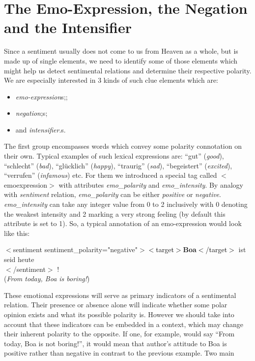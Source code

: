 \documentclass[11pt,a4paper]{article}
\newenvironment{example}{\begin{center}\begin{exe}\ex}{\end{exe}\end{center}}
\newcommand{\xmltag}[1]{\textcolor{black}{{\small$<$#1$>$}}}
\newcommand{\sentiment}[2][negative]{$<$sentiment
  sentiment\_polarity="#1"$>$\textcolor{dodgerblue4}{#2}$<$/sentiment$>$}
\newcommand{\target}[1]{\xmltag{target}\textbf{#1}\xmltag{/target}}
\begin{document}
\section{The Emo-Expression, the Negation and the Intensifier}
Since a sentiment usually does not come to us from Heaven as a whole,
but is made up of single elements, we need to identify some of those
elements which might help us detect sentimental relations and
determine their respective polarity. We are especially interested in 3
kinds of such clue elements which are:
\begin{itemize}
\item \textit{emo-expression}s;\label{eexpression};
\item \textit{negation};\label{negation}s;
\item and \textit{intensifier}.\label{intensifier}s.
\end{itemize}
The first group encompasses words which convey some polarity
connotation on their own. Typical examples of such lexical expressions
are: ``gut'' (\textit{good}), ``schlecht'' (\textit{bad}),
``gl\"ucklich'' (\textit{happy}), ``traurig'' (\textit{sad}),
``begeistert'' (\textit{excited}), ``verrufen'' (\textit{infamous})
etc. For them we introduced a special tag called $<$emoexpression$>$
with attributes \textit{emo\_polarity} and \textit{emo\_intensity}. By
analogy with \textit{sentiment} relation, \textit{emo\_polarity} can
be either \textit{positive} or
\textit{negative}. \textit{emo\_intensity} can take any integer value
from 0 to 2 inclusively with 0 denoting the weakest intensity and 2
marking a very strong feeling (by default this attribute is set to
1). So, a typical annotation of an emo-expression would look like
this:
\begin{example}
  \sentiment{\target{Boa} ist seid heute\\ \emoexpression{langweilig}}
  !\\
  (\textit{From today, Boa is boring!})\label{ex-3}
\end{example}
These emotional expressions will serve as primary indicators of a
sentimental relation. Their presence or absence alone will indicate
whether some polar opinion exists and what its possible polarity
is. However we should take into account that these indicators can be
embedded in a context, which may change their inherent polarity to the
opposite. If one, for example, would say ``From today, Boa is not
boring!'', it would mean that author's attitude to Boa is positive
rather than negative in contrast to the previous example. Two main
\end{document}
